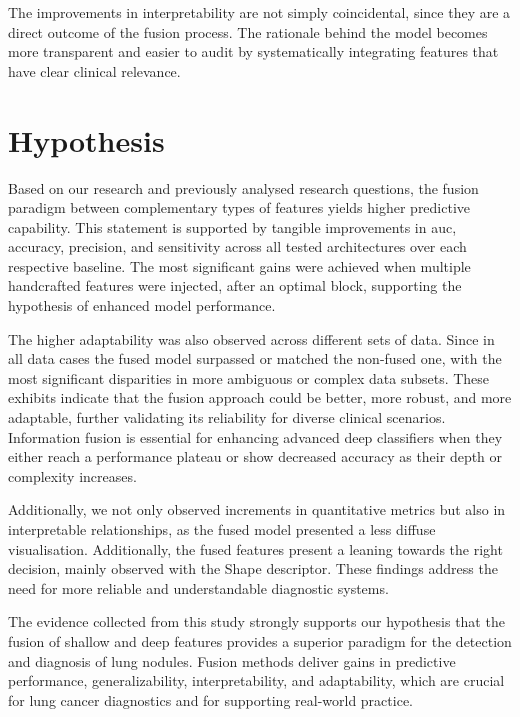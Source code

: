 \begin{enumerate}
The improvements in interpretability are not simply coincidental, since they are a direct outcome of the fusion process. The rationale behind the model becomes more transparent and easier to audit by systematically integrating features that have clear clinical relevance.
\end{enumerate}

\section{Hypothesis}

Based on our research and previously analysed research questions, the fusion paradigm between complementary types of features yields higher predictive capability. This statement is supported by tangible improvements in \ac{auc}, accuracy, precision, and sensitivity across all tested architectures over each respective baseline.
The most significant gains were achieved when multiple handcrafted features were injected, after an optimal block, supporting the hypothesis of enhanced model performance.

The higher adaptability was also observed across different sets of data. Since in all data cases the fused model surpassed or matched the non-fused one, with the most significant disparities in more ambiguous or complex data subsets.
These exhibits indicate that the fusion approach could be better, more robust, and more adaptable, further validating its reliability for diverse clinical scenarios.
Information fusion is essential for enhancing advanced deep classifiers when they either reach a performance plateau or show decreased accuracy as their depth or complexity increases.

Additionally, we not only observed increments in quantitative metrics but also in interpretable relationships, as the fused model presented a less diffuse visualisation. Additionally, the fused features present a leaning towards the right decision, mainly observed with the Shape descriptor.
These findings address the need for more reliable and understandable diagnostic systems.

The evidence collected from this study strongly supports our hypothesis that the fusion of shallow and deep features provides a superior paradigm for the detection and diagnosis of lung nodules.
Fusion methods deliver gains in predictive performance, generalizability, interpretability, and adaptability, which are crucial for lung cancer diagnostics and for supporting real-world practice.


